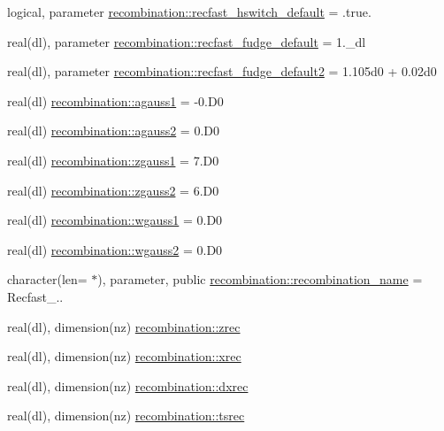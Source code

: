 \begin{DoxyCompactItemize}
\item 
logical, parameter \mbox{\hyperlink{namespacerecombination_ab3f90d31e547798b3aa3fc1403d556fb}{recombination\+::recfast\+\_\+hswitch\+\_\+default}} = .true.
\item 
real(dl), parameter \mbox{\hyperlink{namespacerecombination_a198e64f2c7a763d928e647b4e1de4be9}{recombination\+::recfast\+\_\+fudge\+\_\+default}} = 1.\+\_\+dl
\item 
real(dl), parameter \mbox{\hyperlink{namespacerecombination_afe0b5ce72921eaef12df437e7c994273}{recombination\+::recfast\+\_\+fudge\+\_\+default2}} = 1.\+105d0 + 0.\+02d0
\item 
real(dl) \mbox{\hyperlink{namespacerecombination_a3656f16a64eb43f2c0cc9ede42d7739e}{recombination\+::agauss1}} = -\/0.\+D0
\item 
real(dl) \mbox{\hyperlink{namespacerecombination_ac630e24e5948bae78946e725278366d0}{recombination\+::agauss2}} = 0.\+D0
\item 
real(dl) \mbox{\hyperlink{namespacerecombination_aa4dbcaadd19727bcb40044d8bd9cd923}{recombination\+::zgauss1}} = 7.\+D0
\item 
real(dl) \mbox{\hyperlink{namespacerecombination_a61e4b85fa7e6dbab34fdcc71cbf2ac51}{recombination\+::zgauss2}} = 6.\+D0
\item 
real(dl) \mbox{\hyperlink{namespacerecombination_ab96e636bde8533901e6404afddd90371}{recombination\+::wgauss1}} = 0.\+D0
\item 
real(dl) \mbox{\hyperlink{namespacerecombination_ae8e9ce09a4cbc8282433bb03744dee31}{recombination\+::wgauss2}} = 0.\+D0
\item 
character(len= $\ast$), parameter, public \mbox{\hyperlink{namespacerecombination_aaaa9430d72f4f49786d010958342bc72}{recombination\+::recombination\+\_\+name}} = \textquotesingle{}Recfast\+\_..\textquotesingle{}
\item 
real(dl), dimension(nz) \mbox{\hyperlink{namespacerecombination_ace51a9fec7f3c178e99caf82c7cc6de0}{recombination\+::zrec}}
\item 
real(dl), dimension(nz) \mbox{\hyperlink{namespacerecombination_a43d25f6d69d2b60682ef49868e8f70cd}{recombination\+::xrec}}
\item 
real(dl), dimension(nz) \mbox{\hyperlink{namespacerecombination_a34b4e0fe310c9f5d1705a2e78983d9fa}{recombination\+::dxrec}}
\item 
real(dl), dimension(nz) \mbox{\hyperlink{namespacerecombination_aa13c7a29f1e2c1bb0db8f0f4e6c4cbaa}{recombination\+::tsrec}}

\end{DoxyCompactItemize}
